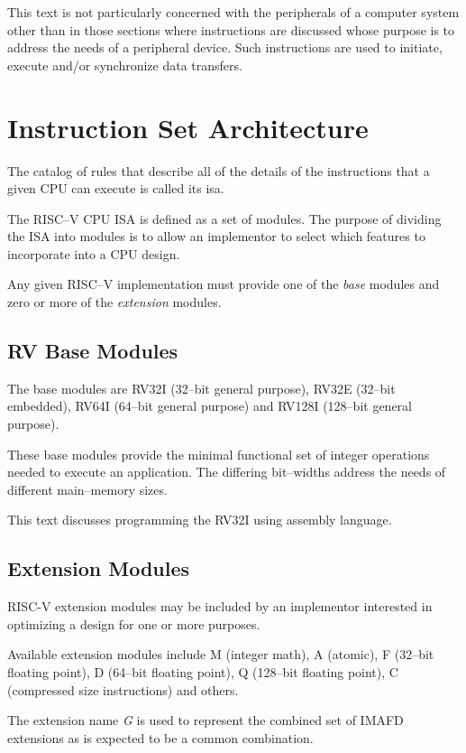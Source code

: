 This text is not particularly concerned with the peripherals of a computer
system other than in those sections where instructions are discussed 
whose purpose is to address the needs of a peripheral device.  Such
instructions are used to initiate, execute and/or synchronize data transfers.


\section{Instruction Set Architecture}

The catalog of rules that describe all of the details of the instructions 
that a given CPU can execute is called its \acrfull{isa}.

The RISC--V CPU ISA is defined as a set of modules.  The purpose of
dividing the ISA into modules is to allow an implementor to select which 
features to incorporate into a CPU design.

Any given RISC--V implementation must provide one of the {\em base}
modules and zero or more of the {\em extension} modules.

\subsection{RV Base Modules}
The base modules are RV32I (32--bit general purpose), 
RV32E (32--bit embedded), RV64I (64--bit general purpose) 
and RV128I (128--bit general purpose).

These base modules provide the minimal functional set of integer operations
needed to execute an application.  The differing bit--widths address
the needs of different main--memory sizes.

This text discusses programming the RV32I using assembly language. 

\subsection{Extension Modules}

RISC-V extension modules may be included by an implementor interested
in optimizing a design for one or more purposes.

Available extension modules include M (integer math), A (atomic),
F (32--bit floating point), D (64--bit floating point), 
Q (128--bit floating point), C (compressed size instructions) and others.

The extension name {\em G} is used to represent the combined set of IMAFD
extensions as is expected to be a common combination.
